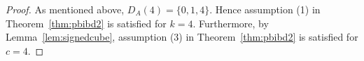 \documentclass[11pt]{article}
\begin{document}
\begin{proof}
As mentioned above, $D_A(4)=\{0,1,4\}$.
Hence assumption (1) in Theorem~\ref{thm:pbibd2} is satisfied for $k=4$.  
Furthermore, by Lemma~\ref{lem:signedcube}, assumption (3) in Theorem~\ref{thm:pbibd2} is satisfied for $c = 4$.


\end{proof}
\end{document}

